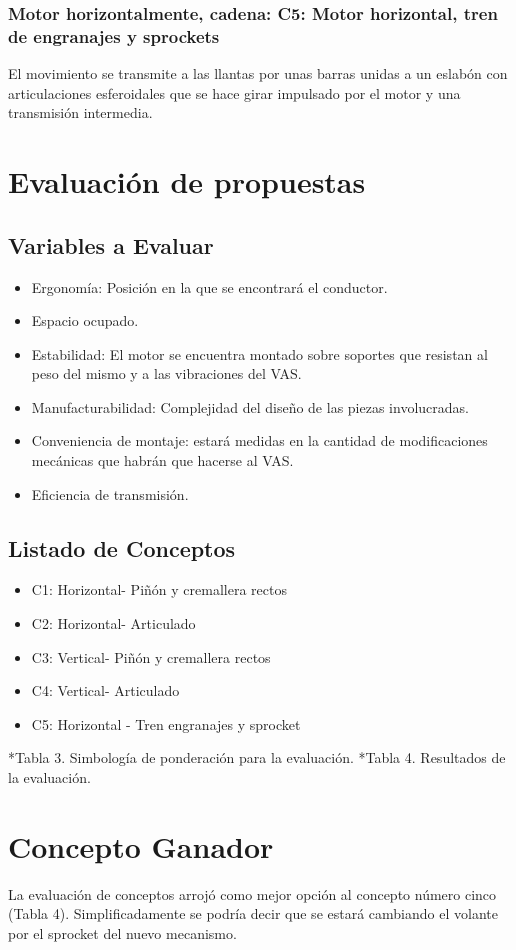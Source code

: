 \subsubsection{Motor horizontalmente, cadena: C5: Motor horizontal, tren de engranajes y sprockets}
El movimiento se transmite a las llantas por unas barras unidas a un eslabón con articulaciones esferoidales que se hace girar impulsado por el motor y una transmisión intermedia.

\section{Evaluación de propuestas}
\subsection{Variables a Evaluar}
\begin{itemize}
\item Ergonomía: Posición en la que se encontrará el conductor.
\item Espacio ocupado.
\item Estabilidad: El motor se encuentra montado sobre soportes que resistan al peso del mismo y a las vibraciones del VAS.
\item Manufacturabilidad: Complejidad del diseño de las piezas involucradas.
\item Conveniencia de montaje: estará medidas en la cantidad de modificaciones mecánicas que habrán que hacerse al VAS.
\item Eficiencia de transmisión.
\end{itemize}
\subsection{Listado de Conceptos}
\begin{itemize}
\item C1: Horizontal- Piñón y cremallera rectos
\item C2: Horizontal- Articulado
\item C3: Vertical- Piñón y cremallera rectos
\item C4: Vertical- Articulado
\item C5: Horizontal - Tren engranajes y sprocket
\end{itemize}

*Tabla 3. Simbología de ponderación para la evaluación.
*Tabla 4. Resultados de la evaluación.

\section{Concepto Ganador}
La evaluación de conceptos arrojó como mejor opción al concepto número cinco (Tabla 4). Simplificadamente se podría decir que se estará cambiando el volante por el sprocket del nuevo mecanismo.

